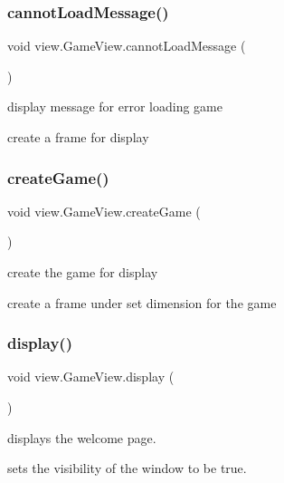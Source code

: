 \subsubsection{\texorpdfstring{cannot\+Load\+Message()}{cannotLoadMessage()}}
{\footnotesize\ttfamily void view.\+Game\+View.\+cannot\+Load\+Message (\begin{DoxyParamCaption}{ }\end{DoxyParamCaption})}



display message for error loading game 

create a frame for display \hypertarget{classview_1_1_game_view_aabb001fdf15e7c066c9dbc588f720cd6}{}\label{classview_1_1_game_view_aabb001fdf15e7c066c9dbc588f720cd6} 
\subsubsection{\texorpdfstring{create\+Game()}{createGame()}}
{\footnotesize\ttfamily void view.\+Game\+View.\+create\+Game (\begin{DoxyParamCaption}{ }\end{DoxyParamCaption})}



create the game for display 

create a frame under set dimension for the game \hypertarget{classview_1_1_game_view_a47f32011f21917818ac92ebecba5dc5b}{}\label{classview_1_1_game_view_a47f32011f21917818ac92ebecba5dc5b} 
\subsubsection{\texorpdfstring{display()}{display()}}
{\footnotesize\ttfamily void view.\+Game\+View.\+display (\begin{DoxyParamCaption}{ }\end{DoxyParamCaption})}



displays the welcome page. 

sets the visibility of the window to be true. \hypertarget{classview_1_1_game_view_aed2c0f38680b0e4ff2ea31c1618416d9}{}\label{classview_1_1_game_view_aed2c0f38680b0e4ff2ea31c1618416d9} 
